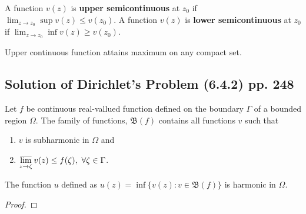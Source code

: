 \begin{definition}[semicontinuous]
	A function $v(z)$ is \textbf{upper semicontinuous} at $z_0$ if $\displaystyle \lim_{z \to z_0} \sup v(z) \le v(z_0)$.
	A function $v(z)$ is \textbf{lower semicontinuous} at $z_0$ if $\displaystyle \lim_{z \to z_0} \inf v(z) \ge v(z_0)$.
\end{definition}

\begin{remark}
	Upper continuous function attains maximum on any compact set.
\end{remark}

\subsection{Solution of Dirichlet's Problem (6.4.2) pp. 248}
\begin{definition}[$\mathfrak{B}(f)$]
	Let $f$ be continuous real-vallued function defined on the boundary $\Gamma$ of a bounded region $\Omega$.
	The family of functions, $\mathfrak{B}(f)$ contains all functions $v$ such that 
	\begin{enumerate}
		\item $v$ is subharmonic in $\Omega$ and
		\item $\displaystyle \varlimsup_{z \to \zeta} v(z) \le f(\zeta),\ \forall \zeta \in \Gamma$.
	\end{enumerate}
\end{definition}
\begin{lemma}
	The function $u$ defined as $u(z) = \inf \{ v(z) : v \in \mathfrak{B}(f)\}$ is harmonic in $\Omega$.
\end{lemma}
\begin{proof}
\end{proof}

